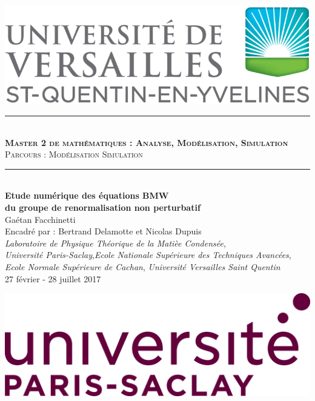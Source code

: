\documentclass[10pt]{article}
\begin{document}
\begin{titlepage}
\begin{center}
\hspace*{20pt}
\includegraphics[scale=0.15]{Logo_Versailles.png}
\\
\vspace*{20pt}
\rule{10cm}{1pt}
\vspace*{10pt} \\
\textsc{\textbf{{\large Master 2 de mathématiques : Analyse, Modélisation, Simulation}}\\
 Parcours : Modélisation Simulation}\\
\rule{10cm}{1pt}
\vspace*{20pt} \\
\textbf{\Large Etude numérique des équations \og BMW \fg{} \\ du groupe de renormalisation non perturbatif}\\
\vspace*{10pt}
Gaétan Facchinetti \\
Encadré par : Bertrand Delamotte  et Nicolas Dupuis
{ \\
\vspace*{15pt}
\textit{Laboratoire de Physique Théorique de la Matièe Condensée},\\
\vspace*{5pt}
\textit{Université Paris-Saclay},\textit{Ecole Nationale Supérieure des Techniques Avancées}, \\
\textit{Ecole Normale Supérieure de Cachan}, \textit{Université Versailles Saint Quentin}}\\
\vspace*{20pt}
{\small 27 février - 28 juillet 2017 }

\end{center}


\vfill
\hfill
\includegraphics[scale=0.25]{parisSaclay.jpg}
\pagebreak

\end{titlepage}
\pagebreak
\end{document}
